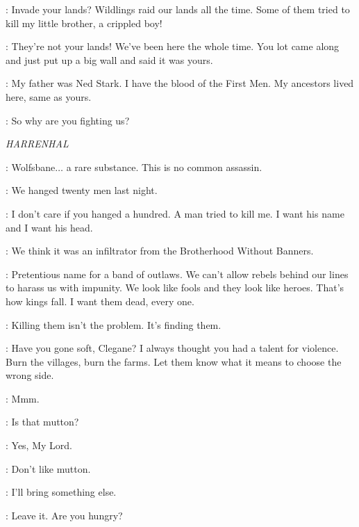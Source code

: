 \JON: Invade your lands? Wildlings raid our lands all the time. Some of them tried to kill my little brother, a crippled boy!

\YGRITTE: They're not your lands! We've been here the whole time. You lot came along and just put up a big wall and said it was yours.

\JON: My father was Ned Stark. I have the blood of the First Men. My ancestors lived here, same as yours.

\enlargethispage*{20pt}
\YGRITTE: So why are you fighting us?



\scene

\textit{HARRENHAL}


\TYWIN: Wolfsbane$\ldots$ a rare substance. This is no common assassin.

\MOUNTAIN: We hanged twenty men last night.

\TYWIN: I don't care if you hanged a hundred. A man tried to kill me. I want his name and I want his head.


\MOUNTAIN: We think it was an infiltrator from the Brotherhood Without Banners.

\TYWIN: Pretentious name for a band of outlaws. We can't allow rebels behind our lines to harass us with impunity. We look like fools and they look like heroes. That's how kings fall. I want them dead, every one.

\MOUNTAIN: Killing them isn't the problem. It's finding them.

\TYWIN: Have you gone soft, Clegane? I always thought you had a talent for violence. Burn the villages, burn the farms. Let them know what it means to choose the wrong side.

\MOUNTAIN: Mmm.


\TYWIN: Is that mutton?

\ARYA: Yes, My Lord.

\TYWIN: Don't like mutton.

\ARYA: I'll bring something else.

\TYWIN: Leave it. Are you hungry?

